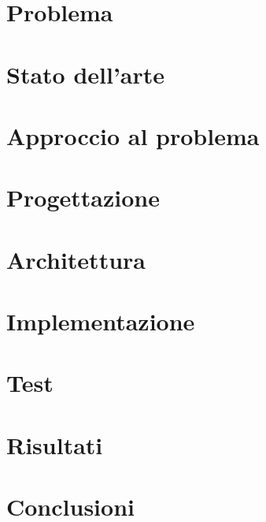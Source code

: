 \documentclass[twoside]{supsistudent}
\begin{document}
\chapter{Problema}
\chapter{Stato dell'arte}
\chapter{Approccio al problema}
\chapter{Progettazione}
\chapter{Architettura}
\chapter{Implementazione}
\chapter{Test}
\chapter{Risultati}
\chapter{Conclusioni}



\end{document}
